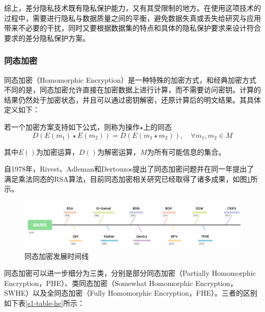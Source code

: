 综上，差分隐私技术既有隐私保护能力，又有其受限制的地方。在使用这项技术的过程中，需要进行隐私与数据质量之间的平衡，避免数据失真或丢失给研究与应用带来不必要的干扰，同时又要根据数据集的特点和具体的隐私保护要求来设计符合要求的差分隐私保护方案。

\subsubsection{同态加密}
同态加密（Homomorphic Encryption）是一种特殊的加密方式，和经典加密方式不同的是，同态加密允许直接在加密数据上进行计算，而不需要访问密钥。计算的结果仍然处于加密状态，并且可以通过密钥解密，还原计算后的明文结果。其具体定义如下：
\begin{definition}
	若一个加密方案支持如下公式，则称为操作$ \star $上的同态
	\begin{equation}
		D(E\left(m_1\right) \star E\left(m_2\right))=D(E\left(m_1 \star m_2\right)), \quad \forall m_1, m_2 \in M
	\end{equation}

	其中$ E() $为加密运算，$ D() $为解密运算，$ M $为所有可能信息的集合。
\end{definition}

自1978年，Rivest、Adleman和Dertouzos提出了同态加密问题\cite{rivest1978data}并在同一年提出了满足乘法同态的RSA算法，目前同态加密相关研究已经取得了诸多成果，如图\ref{timeline}所示。

\begin{figure}[htbp]
	\centering
	\includegraphics[scale=0.10]{img/he-timeline.png}
	\caption{同态加密发展时间线}
	\label{timeline}
\end{figure}

同态加密可以进一步细分为三类，分别是部分同态加密（Partially Homomorphic Encryption，PHE）、类同态加密（Somewhat Homomorphic Encryption，SWHE）以及全同态加密（Fully Homomorphic Encryption，FHE）。三者的区别如下表\ref{s1-table-he}所示：

\begin{table}[htbp]
	\renewcommand{\arraystretch}{1.3}
	\caption{同态加密方案对比}
	\label{s1-table-he}
\end{table}


